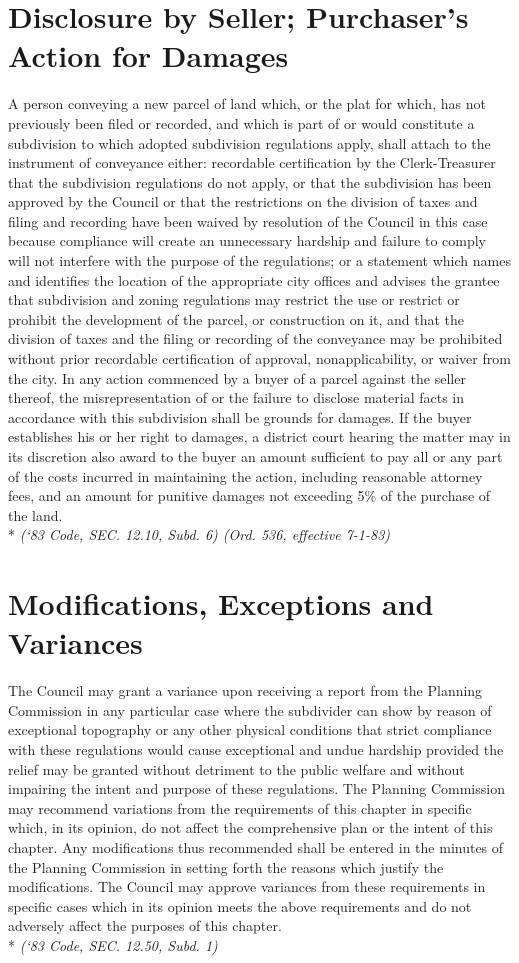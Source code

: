 \section{Disclosure by Seller; Purchaser’s Action for Damages}
A person conveying a new parcel of land which, or the plat for which, has not previously been filed or recorded, and which is part of or would constitute a subdivision to which adopted subdivision regulations apply, shall attach to the instrument of conveyance either: recordable certification by the Clerk-Treasurer that the subdivision regulations do not apply, or that the subdivision has been approved by the Council or that the restrictions on the division of taxes and filing and recording have been waived by resolution of the Council in this case because compliance will create an unnecessary hardship and failure to comply will not interfere with the purpose of the regulations; or a statement which names and identifies the location of the appropriate city offices and advises the grantee that subdivision and zoning regulations may restrict the use or restrict or prohibit the development of the parcel, or construction on it, and that the division of taxes and the filing or recording of the conveyance may be prohibited without prior recordable certification of approval, nonapplicability, or waiver from the city. In any action commenced by a buyer of a parcel against the seller thereof, the misrepresentation of or the failure to disclose material facts in accordance with this subdivision shall be grounds for damages.  If the buyer establishes his or her right to damages, a district court hearing the matter may in its discretion also award to the buyer an amount sufficient to pay all or any part of the costs incurred in maintaining the action, including reasonable attorney fees, and an amount for punitive damages not exceeding 5\% of the purchase of the land.\\*
\emph{(‘83 Code, SEC. 12.10, Subd. 6)  (Ord. 536, effective 7-1-83)}
\section{Modifications, Exceptions and Variances}
The Council may grant a variance upon receiving a report from the Planning Commission in any particular case where the subdivider can show by reason of exceptional topography or any other physical conditions that strict compliance with these regulations would cause exceptional and undue hardship provided the relief may be granted without detriment to the public welfare and without impairing the intent and purpose of these regulations. The Planning Commission may recommend variations from the requirements of this chapter in specific which, in its opinion, do not affect the comprehensive plan or the intent of this chapter.  Any modifications thus recommended shall be entered in the minutes of the Planning Commission in setting forth the reasons which justify the modifications.  The Council may approve variances from these requirements in specific cases which in its opinion meets the above requirements and do not adversely affect the purposes of this chapter.\\*
\emph{(‘83 Code, SEC. 12.50, Subd. 1)}
